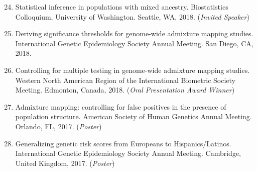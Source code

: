 \documentclass[margin]{res}
\newenvironment{benumerate}[1]{
    \let\oldItem\item
    \def\item{\addtocounter{enumi}{-2}\oldItem}
    
    \begin{enumerate}
    \setcounter{enumi}{#1}
    \addtocounter{enumi}{1}
}{
    \end{enumerate}
}
\begin{document}
\begin{resume}
\begin{benumerate}{23}

\item %
Statistical inference in populations with mixed ancestry. Biostatistics Colloquium, University of Washington. Seattle, WA, 2018.  (\textit{Invited Speaker})

\item %
Deriving significance thresholds for genome-wide admixture mapping studies. International Genetic Epidemiology Society Annual Meeting. San Diego, CA, 2018. 


\item %
Controlling for multiple testing in genome-wide admixture mapping studies. Western North American Region of the International Biometric Society Meeting. Edmonton, Canada, 2018. (\textit{Oral Presentation Award Winner})



\item %
Admixture mapping: controlling for false positives in the presence of population structure. American Society of Human Genetics Annual Meeting. Orlando, FL, 2017. (\textit{Poster})

\item %
Generalizing genetic risk scores from Europeans to Hispanics/Latinos. International Genetic Epidemiology Society Annual Meeting. Cambridge, United Kingdom, 2017. (\textit{Poster})



\end{benumerate}
\end{resume}
\end{document}
